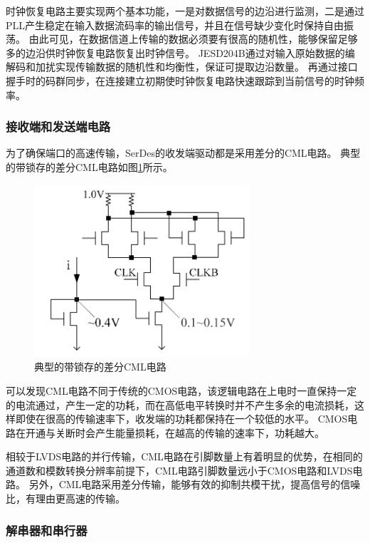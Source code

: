 \documentclass[UTF8]{ctexart}
\begin{document}
时钟恢复电路主要实现两个基本功能，一是对数据信号的边沿进行监测，二是通过PLL产生稳定在输入数据流码率的输出信号，并且在信号缺少变化时保持自由振荡。
由此可见，在数据信道上传输的数据必须要有很高的随机性，能够保留足够多的边沿供时钟恢复电路恢复出时钟信号。
JESD204B通过对输入原始数据的编解码和加扰实现传输数据的随机性和均衡性，保证可提取边沿数量。
再通过接口握手时的码群同步，在连接建立初期使时钟恢复电路快速跟踪到当前信号的时钟频率。

\subsubsection{接收端和发送端电路}

为了确保端口的高速传输，SerDes的收发端驱动都是采用差分的CML电路。
典型的带锁存的差分CML电路如图\ref{fig:standard_CML_latch_with_poor_mirror_accuracy}所示。

\begin{figure}[H]
\centering
\includegraphics[width=8cm]{./img/standard_CML_latch_with_poor_mirror_accuracy.png}
\caption{典型的带锁存的差分CML电路}
\label{fig:standard_CML_latch_with_poor_mirror_accuracy}
\end{figure}

可以发现CML电路不同于传统的CMOS电路，该逻辑电路在上电时一直保持一定的电流通过，产生一定的功耗，而在高低电平转换时并不产生多余的电流损耗，这样即使在很高的传输速率下，收发端的功耗都保持在一个较低的水平。
CMOS电路在开通与关断时会产生能量损耗，在越高的传输的速率下，功耗越大。

相较于LVDS电路的并行传输，CML电路在引脚数量上有着明显的优势，在相同的通道数和模数转换分辨率前提下，CML电路引脚数量远小于CMOS电路和LVDS电路\cite{Harris2013}。
另外，CML电路采用差分传输，能够有效的抑制共模干扰，提高信号的信噪比，有理由更高速的传输。

\subsubsection{解串器和串行器}
\end{document}
